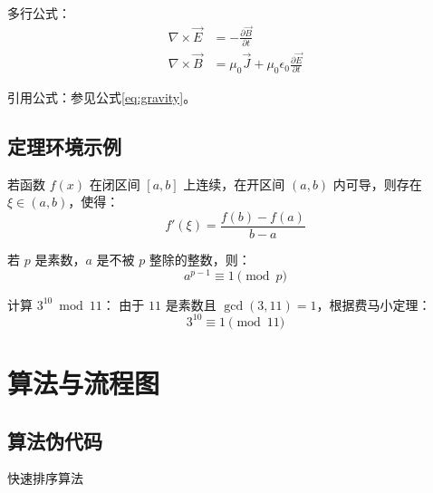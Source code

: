 \documentclass[../main]{subfiles}
\begin{document}
多行公式：
\begin{align}
    \nabla \times \vec{E} &= -\frac{\partial \vec{B}}{\partial t} \label{eq:faraday}\\
    \nabla \times \vec{B} &= \mu_0\vec{J} + \mu_0\epsilon_0\frac{\partial \vec{E}}{\partial t} \label{eq:ampere}
\end{align}

引用公式：参见公式\cref{eq:gravity}。

\subsection{定理环境示例}

\begin{definition}[拉格朗日中值定理]
若函数 $f(x)$ 在闭区间 $[a,b]$ 上连续，在开区间 $(a,b)$ 内可导，则存在 $\xi \in (a,b)$，使得：
$$f'(\xi) = \frac{f(b) - f(a)}{b - a}$$
\end{definition}

\begin{theorem}[费马小定理]
若 $p$ 是素数，$a$ 是不被 $p$ 整除的整数，则：
$$a^{p-1} \equiv 1 \pmod{p}$$
\end{theorem}

\begin{example}
计算 $3^{10} \bmod 11$：
由于 $11$ 是素数且 $\gcd(3,11)=1$，根据费马小定理：
$$3^{10} \equiv 1 \pmod{11}$$
\end{example}

\section{算法与流程图}

\subsection{算法伪代码}

\begin{algorithm}[H]
\caption{快速排序算法}
\label{alg:quicksort}


\end{algorithm}
\end{document}
